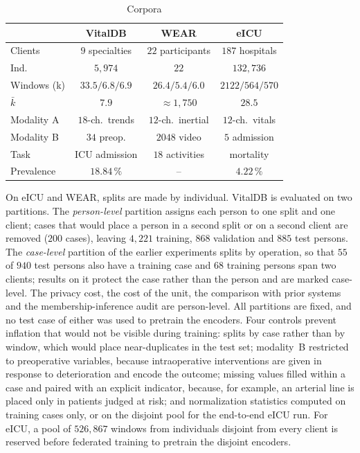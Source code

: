 \begin{table}[!t]
\centering
\caption{Corpora}
\label{tab:data}
\setlength{\tabcolsep}{2.6pt}
\small
\begin{tabular}{lccc}
\toprule
& VitalDB & WEAR & eICU \\
\midrule
Clients     & $9$ specialties & $22$ participants & $187$ hospitals \\
Ind.        & $5{,}974$ & $22$ & $132{,}736$ \\
Windows (k) & $33.5/6.8/6.9$ & $26.4/5.4/6.0$ & $2122/564/570$ \\
$\bar{k}$   & $7.9$ & ${\approx}1{,}750$ & $28.5$ \\
Modality A  & $18$-ch.\ trends & $12$-ch.\ inertial & $12$-ch.\ vitals \\
Modality B  & $34$ preop. & $2048$ video & $5$ admission \\
Task        & ICU admission & $18$ activities & mortality \\
Prevalence  & $18.84\,\%$ & -- & $4.22\,\%$ \\
\bottomrule
\end{tabular}
\end{table}

On eICU and WEAR, splits are made by individual. VitalDB is evaluated on two
partitions. The \emph{person-level} partition assigns each person to one
split and one client; cases that would place a person in a second split or on
a second client are removed ($200$ cases), leaving $4{,}221$ training, $868$
validation and $885$ test persons. The \emph{case-level} partition of the
earlier experiments splits by operation, so that $55$ of $940$ test persons
also have a training case and $68$ training persons span two clients; results
on it protect the case rather than the person and are marked case-level. The
privacy cost, the cost of the unit, the comparison with prior systems and the
membership-inference audit are person-level. All partitions are fixed, and no test case of either was used to
pretrain the encoders. Four controls prevent inflation that would
not be visible during training: splits by case rather than by window, which
would place near-duplicates in the test set; modality~B restricted to
preoperative variables, because intraoperative interventions are given in
response to deterioration and encode the outcome; missing values filled
within a case and paired with an explicit indicator, because, for example, an
arterial line is placed only in patients judged at risk; and normalization
statistics computed on training cases only, or on the disjoint pool for the
end-to-end eICU run. For eICU, a pool of $526{,}867$
windows from individuals disjoint from every client is reserved before
federated training to pretrain the disjoint encoders.

